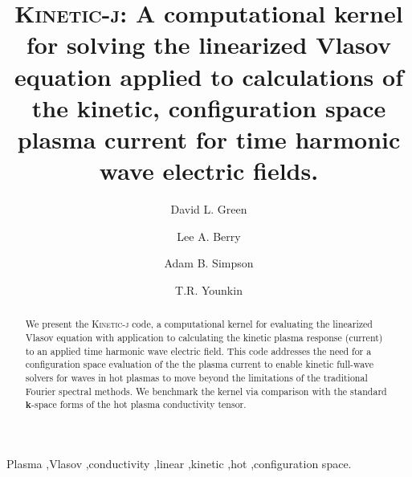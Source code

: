 \documentclass[final,5p,times,twocolumn]{elsarticle}
\renewcommand{\vec}[1]{\mathbf{#1}}
\newcommand{\kj}{\textsc{Kinetic-j}\xspace}
\begin{document}
\begin{frontmatter}



\title{\kj: A computational kernel for solving the linearized Vlasov equation applied to calculations of the kinetic, configuration space plasma current for time harmonic wave electric fields.}


\author[a]{David L. Green}
\author[a,b]{Lee A. Berry}
\author[b]{Adam B. Simpson}
\author[a,c]{T.R. Younkin}

\address[a]{Oak Ridge National Laboratory, 1 Bethel Valley Rd., Oak Ridge, Tennessee 37831, USA}
\address[b]{XCEL Engineering, 1066 Commerce Park Dr., Oak Ridge, Tennessee 37830, USA}
\address[c]{Universtity of Tennessee, Knoxville, Tennessee 37996, USA}

\begin{abstract}
We present the \kj code, a computational kernel for evaluating the linearized Vlasov equation with application to calculating the kinetic plasma response (current) to an applied time harmonic wave electric field. This code addresses the need for a configuration space evaluation of the the plasma current to enable kinetic full-wave solvers for waves in hot plasmas to move beyond the limitations of the traditional Fourier spectral methods. We benchmark the kernel via comparison with the standard $\vec{k}$-space forms of the hot plasma conductivity tensor. 
\end{abstract}

\begin{keyword}
Plasma \sep Vlasov \sep conductivity \sep linear \sep kinetic \sep hot \sep configuration space.

\end{keyword}

\end{frontmatter}
\end{document}

